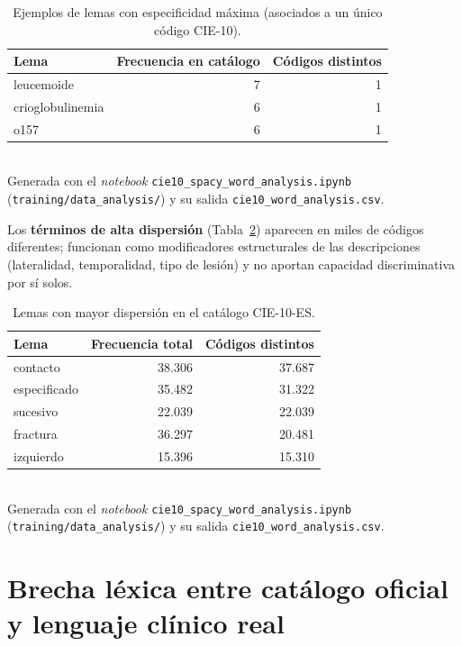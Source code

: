 \begin{table}[h]
\centering
\caption{Ejemplos de lemas con especificidad máxima (asociados a un único código CIE-10).}
\label{tab:high-spec}
\begin{tabular}{lrr}
\hline
\textbf{Lema} & \textbf{Frecuencia en catálogo} & \textbf{Códigos distintos} \\
\hline
leucemoide & 7 & 1 \\
crioglobulinemia & 6 & 1 \\
o157 & 6 & 1 \\
\hline
\end{tabular}
\\[4pt]
{\footnotesize Generada con el \emph{notebook} \texttt{cie10\_\allowbreak{}spacy\_\allowbreak{}word\_\allowbreak{}analysis.ipynb} (\texttt{training/\allowbreak{}data\_analysis/}) y su salida \texttt{cie10\_\allowbreak{}word\_\allowbreak{}analysis.csv}.}
\end{table}

Los \textbf{términos de alta dispersión} (Tabla~\ref{tab:high-disp}) aparecen en miles de códigos diferentes; funcionan como modificadores estructurales de las descripciones (lateralidad, temporalidad, tipo de lesión) y no aportan capacidad discriminativa por sí solos.

\begin{table}[h]
\centering
\caption{Lemas con mayor dispersión en el catálogo CIE-10-ES.}
\label{tab:high-disp}
\begin{tabular}{lrr}
\hline
\textbf{Lema} & \textbf{Frecuencia total} & \textbf{Códigos distintos} \\
\hline
contacto & 38.306 & 37.687 \\
especificado & 35.482 & 31.322 \\
sucesivo & 22.039 & 22.039 \\
fractura & 36.297 & 20.481 \\
izquierdo & 15.396 & 15.310 \\
\hline
\end{tabular}
\\[4pt]
{\footnotesize Generada con el \emph{notebook} \texttt{cie10\_\allowbreak{}spacy\_\allowbreak{}word\_\allowbreak{}analysis.ipynb} (\texttt{training/\allowbreak{}data\_analysis/}) y su salida \texttt{cie10\_\allowbreak{}word\_\allowbreak{}analysis.csv}.}
\end{table}

\section{Brecha léxica entre catálogo oficial y lenguaje clínico real}
\label{sec:brecha-lexica}

